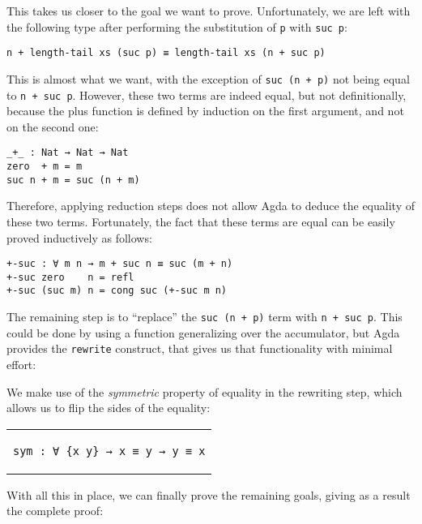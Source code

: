 \documentclass[runningheads]{llncs}
\begin{document}
This takes us closer to the goal we want to prove. Unfortunately, we are left with the
following type after performing the substitution of \lstinline{p} with \lstinline{suc p}:

\begin{lstlisting}
n + length-tail xs (suc p) ≡ length-tail xs (n + suc p)
\end{lstlisting}

This is almost what we want, with the exception of \lstinline{suc (n + p)} not being
equal to \lstinline{n + suc p}. However, these two terms are indeed equal, but not
definitionally, because the plus function is defined by induction on the first argument,
and not on the second one:

\begin{lstlisting}
_+_ : Nat → Nat → Nat
zero  + m = m
suc n + m = suc (n + m)
\end{lstlisting}

Therefore, applying reduction steps does not allow Agda to deduce the equality of these
two terms. Fortunately, the fact that these terms are equal can be easily proved
inductively as follows:

\begin{lstlisting}
+-suc : ∀ m n → m + suc n ≡ suc (m + n)
+-suc zero    n = refl
+-suc (suc m) n = cong suc (+-suc m n)
\end{lstlisting}

The remaining step is to ``replace'' the \lstinline{suc (n + p)} term with
\lstinline{n + suc p}. This could be done by using a function generalizing over the
accumulator, but Agda provides the \lstinline{rewrite} construct, that gives us that
functionality with minimal effort:



We make use of the \emph{symmetric} property of equality in the rewriting step, which
allows us to flip the sides of the equality:

\begin{center}
\begin{tabular}{c}
\begin{lstlisting}
sym : ∀ {x y} → x ≡ y → y ≡ x
\end{lstlisting}
\end{tabular}
\end{center}

With all this in place, we can finally prove the remaining goals, giving as a result the
complete proof:
\end{document}
